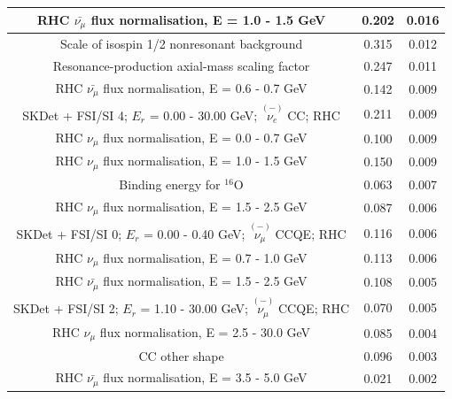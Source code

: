 \begin{table}
\begin{tabular}{| c | c | c |}
                                      RHC $\bar{\nu_\mu}$ flux normalisation, E = 1.0 - 1.5 GeV & 0.202 & 0.016 \\ \hline 
                                                    Scale of isospin 1/2 nonresonant background & 0.315 & 0.012 \\ \hline 
                                                 Resonance-production axial-mass scaling factor & 0.247 & 0.011 \\ \hline 
                                      RHC $\bar{\nu_\mu}$ flux normalisation, E = 0.6 - 0.7 GeV & 0.142 & 0.009 \\ \hline 
                   SKDet + FSI/SI  4; $E_r$ =  0.00 - 30.00 GeV; $\overset{(-)}{\nu_e}$ CC; RHC & 0.211 & 0.009 \\ \hline 
                                            RHC $\nu_\mu$ flux normalisation, E = 0.0 - 0.7 GeV & 0.100 & 0.009 \\ \hline 
                                            RHC $\nu_\mu$ flux normalisation, E = 1.0 - 1.5 GeV & 0.150 & 0.009 \\ \hline 
                                                                    Binding energy for $^{16}$O & 0.063 & 0.007 \\ \hline 
                                            RHC $\nu_\mu$ flux normalisation, E = 1.5 - 2.5 GeV & 0.087 & 0.006 \\ \hline 
                SKDet + FSI/SI  0; $E_r$ =  0.00 - 0.40 GeV; $\overset{(-)}{\nu_\mu}$ CCQE; RHC & 0.116 & 0.006 \\ \hline 
                                            RHC $\nu_\mu$ flux normalisation, E = 0.7 - 1.0 GeV & 0.113 & 0.006 \\ \hline 
                                      RHC $\bar{\nu_\mu}$ flux normalisation, E = 1.5 - 2.5 GeV & 0.108 & 0.005 \\ \hline 
               SKDet + FSI/SI  2; $E_r$ =  1.10 - 30.00 GeV; $\overset{(-)}{\nu_\mu}$ CCQE; RHC & 0.070 & 0.005 \\ \hline 
                                           RHC $\nu_\mu$ flux normalisation, E = 2.5 - 30.0 GeV & 0.085 & 0.004 \\ \hline 
                                                                                 CC other shape & 0.096 & 0.003 \\ \hline 
                                      RHC $\bar{\nu_\mu}$ flux normalisation, E = 3.5 - 5.0 GeV & 0.021 & 0.002 \\ \hline 

\end{tabular}
\end{table}
